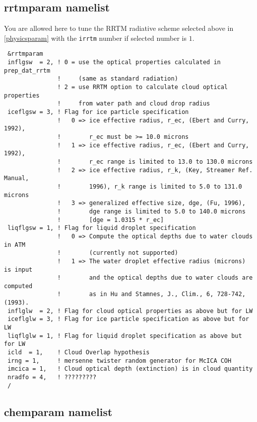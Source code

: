 \subsection{rrtmparam namelist}

You are allowed here to tune the RRTM radiative scheme selected above in
\ref{physicsparam} with the \verb=irrtm= number if selected number is $1$. 

{\footnotesize
\begin{Verbatim}
 &rrtmparam
 inflgsw  = 2, ! 0 = use the optical properties calculated in prep_dat_rrtm
               !     (same as standard radiation)
               ! 2 = use RRTM option to calculate cloud optical properties
               !     from water path and cloud drop radius
 iceflgsw = 3, ! Flag for ice particle specification
               !   0 => ice effective radius, r_ec, (Ebert and Curry, 1992),
               !        r_ec must be >= 10.0 microns
               !   1 => ice effective radius, r_ec, (Ebert and Curry, 1992),
               !        r_ec range is limited to 13.0 to 130.0 microns
               !   2 => ice effective radius, r_k, (Key, Streamer Ref. Manual,
               !        1996), r_k range is limited to 5.0 to 131.0 microns
               !   3 => generalized effective size, dge, (Fu, 1996),
               !        dge range is limited to 5.0 to 140.0 microns
               !        [dge = 1.0315 * r_ec]
 liqflgsw = 1, ! Flag for liquid droplet specification
               !   0 => Compute the optical depths due to water clouds in ATM
               !        (currently not supported)
               !   1 => The water droplet effective radius (microns) is input
               !        and the optical depths due to water clouds are computed
               !        as in Hu and Stamnes, J., Clim., 6, 728-742, (1993).
 inflglw  = 2, ! Flag for cloud optical properties as above but for LW
 iceflglw = 3, ! Flag for ice particle specification as above but for LW
 liqflglw = 1, ! Flag for liquid droplet specification as above but for LW
 icld  = 1,    ! Cloud Overlap hypothesis
 irng = 1,     ! mersenne twister random generator for McICA COH
 imcica = 1,   ! Cloud optical depth (extinction) is in cloud quantity
 nradfo = 4,   ! ?????????
 /
\end{Verbatim}
}

\subsection{chemparam namelist}
\label{chemparam}

